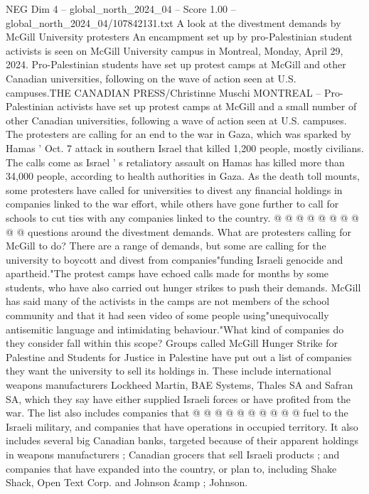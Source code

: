 \begin{textsample}{NEG Dim 4 – global\_north\_2024\_04 – Score 1.00 – global\_north\_2024\_04/107842131.txt}  \label{ex:f4_neg_096}
A look at the divestment demands by McGill University protesters An encampment set up by pro-Palestinian student activists is seen on McGill University campus in Montreal, Monday, April 29, 2024.
Pro-Palestinian students have set up protest camps at McGill and other Canadian universities, following on the wave of action seen at U.S. campuses.THE CANADIAN PRESS/Christinne Muschi MONTREAL -- Pro-Palestinian activists have set up protest camps at McGill and a small number of other Canadian universities, following a wave of action seen at U.S. campuses.
The protesters are calling for an end to the war in Gaza, which was sparked by Hamas ' Oct. 7 attack in southern Israel that killed 1,200 people, mostly civilians.
The calls come as Israel ' s retaliatory assault on Hamas has killed more than 34,000 people, according to health authorities in Gaza.
As the death toll mounts, some protesters have called for universities to divest any financial holdings in companies linked to the war effort, while others have gone further to call for schools to cut ties with any companies linked to the country. @ @ @ @ @ @ @ @ @ @ questions around the divestment demands.
What are protesters calling for McGill to do?
There are a range of demands, but some are calling for the university to boycott and divest from companies"funding Israeli genocide and apartheid."The protest camps have echoed calls made for months by some students, who have also carried out hunger strikes to push their demands.
McGill has said many of the activists in the camps are not members of the school community and that it had seen video of some people using"unequivocally antisemitic language and intimidating behaviour."What kind of companies do they consider fall within this scope?
Groups called McGill Hunger Strike for Palestine and Students for Justice in Palestine have put out a list of companies they want the university to sell its holdings in.
These include international weapons manufacturers Lockheed Martin, BAE Systems, Thales SA and Safran SA, which they say have either supplied Israeli forces or have profited from the war.
The list also includes companies that @ @ @ @ @ @ @ @ @ @ fuel to the Israeli military, and companies that have operations in occupied territory.
It also includes several big Canadian banks, targeted because of their apparent holdings in weapons manufacturers ; Canadian grocers that sell Israeli products ; and companies that have expanded into the country, or plan to, including Shake Shack, Open Text Corp. and Johnson \&amp ; Johnson.

\end{textsample}
